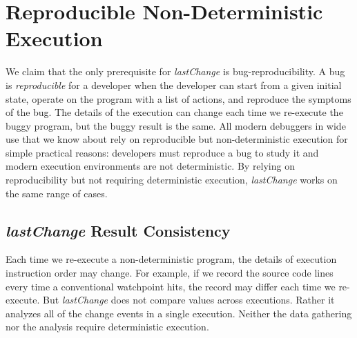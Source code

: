 \documentclass{sig-alternate}
\begin{document}
\section{Reproducible Non-Deterministic Execution}
We claim that the only prerequisite for \textit{lastChange}  is bug-reproducibility. 
A bug is \textit{reproducible} for a developer when the developer can
start from a given initial state, operate on the program with a
list of actions, and reproduce the symptoms of the bug. The details of
the execution can change each time we re-execute the buggy program,
but the buggy result is the same.  All modern debuggers in wide use that we know 
about rely on reproducible but non-deterministic execution for simple practical reasons: 
developers must reproduce a bug to study it and modern execution environments 
are not deterministic.  
By relying on reproducibility but 
not requiring deterministic execution, \textit{lastChange} works on the same range of cases.

\subsection{{\large\bf\textit{lastChange}} Result Consistency}
\label{sec:resultConsistency}

Each time we re-execute a non-deterministic program, 
the details of execution instruction order may change. 
For example, if we record the source code lines every time
a conventional watchpoint hits, the record may differ each time we
re-execute. But \textit{lastChange} does not compare values across 
executions. Rather it analyzes all of the
change events in a single execution. 
Neither the data gathering nor the analysis require deterministic execution.
\end{document}
